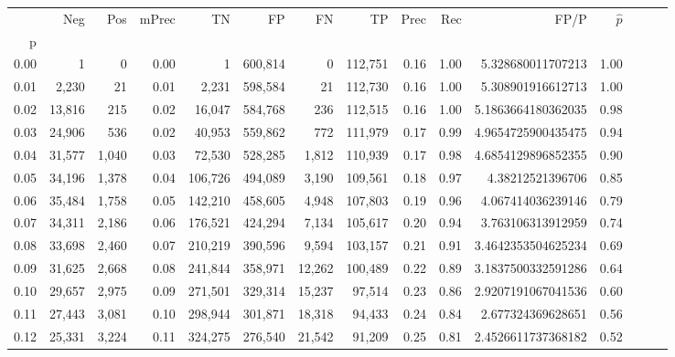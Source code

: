 \begin{tabular}{rrrrrrrrrrrrrrr}
\toprule
{} &     Neg &    Pos & mPrec &       TN &       FP &       FN &       TP &  Prec &   Rec &                    FP/P & $\hat{p}$ \\
p    &         &        &       &          &          &          &          &       &       &                         &           \\
\midrule
0.00 &       1 &      0 &  0.00 &        1 &  600,814 &        0 &  112,751 &  0.16 &  1.00 &       5.328680011707213 &      1.00 \\
0.01 &   2,230 &     21 &  0.01 &    2,231 &  598,584 &       21 &  112,730 &  0.16 &  1.00 &       5.308901916612713 &      1.00 \\
0.02 &  13,816 &    215 &  0.02 &   16,047 &  584,768 &      236 &  112,515 &  0.16 &  1.00 &      5.1863664180362035 &      0.98 \\
0.03 &  24,906 &    536 &  0.02 &   40,953 &  559,862 &      772 &  111,979 &  0.17 &  0.99 &      4.9654725900435475 &      0.94 \\
0.04 &  31,577 &  1,040 &  0.03 &   72,530 &  528,285 &    1,812 &  110,939 &  0.17 &  0.98 &      4.6854129896852355 &      0.90 \\
0.05 &  34,196 &  1,378 &  0.04 &  106,726 &  494,089 &    3,190 &  109,561 &  0.18 &  0.97 &        4.38212521396706 &      0.85 \\
0.06 &  35,484 &  1,758 &  0.05 &  142,210 &  458,605 &    4,948 &  107,803 &  0.19 &  0.96 &       4.067414036239146 &      0.79 \\
0.07 &  34,311 &  2,186 &  0.06 &  176,521 &  424,294 &    7,134 &  105,617 &  0.20 &  0.94 &       3.763106313912959 &      0.74 \\
0.08 &  33,698 &  2,460 &  0.07 &  210,219 &  390,596 &    9,594 &  103,157 &  0.21 &  0.91 &      3.4642353504625234 &      0.69 \\
0.09 &  31,625 &  2,668 &  0.08 &  241,844 &  358,971 &   12,262 &  100,489 &  0.22 &  0.89 &      3.1837500332591286 &      0.64 \\
0.10 &  29,657 &  2,975 &  0.09 &  271,501 &  329,314 &   15,237 &   97,514 &  0.23 &  0.86 &      2.9207191067041536 &      0.60 \\
0.11 &  27,443 &  3,081 &  0.10 &  298,944 &  301,871 &   18,318 &   94,433 &  0.24 &  0.84 &       2.677324369628651 &      0.56 \\
0.12 &  25,331 &  3,224 &  0.11 &  324,275 &  276,540 &   21,542 &   91,209 &  0.25 &  0.81 &      2.4526611737368182 &      0.52 \\

\end{tabular}
